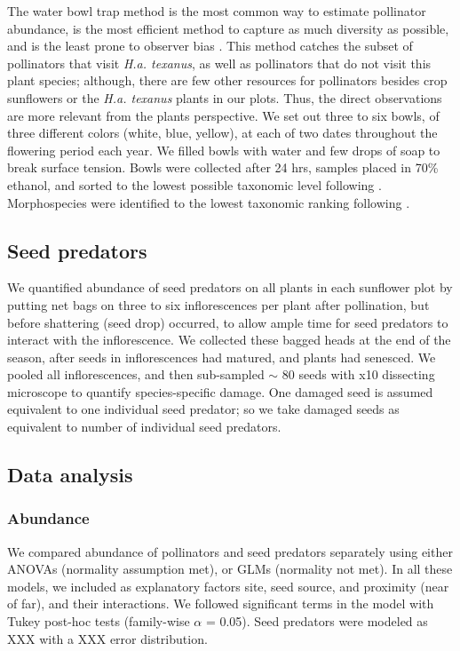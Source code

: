 \documentclass[12pt]{article}
\begin{document}
The water bowl trap method is the most common way to estimate pollinator abundance, is the most efficient method to capture as much diversity as possible, and is the least prone to observer bias \citep{Westphal2008}.  This method catches the subset of pollinators that visit \textit{H.a. texanus}, as well as pollinators that do not visit this plant species; although, there are few other resources for pollinators besides crop sunflowers or the \textit{H.a. texanus} plants in our plots.  Thus, the direct observations are more relevant from the plants perspective.  We set out three to six bowls, of three different colors (white, blue, yellow), at each of two dates throughout the flowering period each year.  We filled bowls with water and few drops of soap to break surface tension.  Bowls were collected after 24 hrs, samples placed in 70\% ethanol, and sorted to the lowest possible taxonomic level following \citet{Michener2000}.   Morphospecies were identified to the lowest taxonomic ranking following \citep{Michener1994,Michener2000}.

\subsection{Seed predators}
We quantified abundance of seed predators on all plants in each sunflower plot by putting net bags on three to six inflorescences per plant after pollination, but before shattering (seed drop) occurred, to allow ample time for seed predators to interact with the inflorescence.  We collected these bagged heads at the end of the season, after seeds in inflorescences had matured, and plants had senesced. We pooled all inflorescences, and then sub-sampled $\sim$ 80 seeds with x10 dissecting microscope to quantify species-specific damage.  One damaged seed is assumed equivalent to one individual seed predator; so we take damaged seeds as equivalent to number of individual seed predators. 

\subsection{Data analysis}
\subsubsection{Abundance}  
We compared abundance of pollinators and seed predators separately using either ANOVAs (normality assumption met), or GLMs (normality not met).  In all these models, we included as explanatory factors site, seed source, and proximity (near of far), and their interactions.  We followed significant terms in the model with Tukey post-hoc tests (family-wise $\alpha$ = 0.05).  Seed predators were modeled as XXX with a XXX error distribution.  
\end{document}
